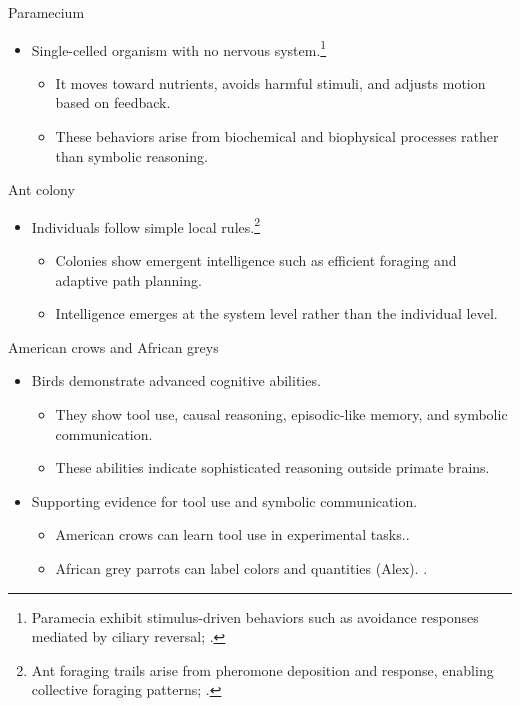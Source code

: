 \documentclass[12pt]{beamer}
\begin{document}
\begin{frame}{Paramecium}
  \begin{itemize}
    \item Single-celled organism with no nervous system.\footnote{Paramecia exhibit stimulus-driven behaviors such as avoidance responses mediated by ciliary reversal; .}
      \begin{itemize}
        \item It moves toward nutrients, avoids harmful stimuli, and adjusts motion based on feedback.
        \item These behaviors arise from biochemical and biophysical processes rather than symbolic reasoning.
      \end{itemize}
  \end{itemize}
\end{frame}

\begin{frame}{Ant colony}
  \begin{itemize}
    \item Individuals follow simple local rules.\footnote{Ant foraging trails arise from pheromone deposition and response, enabling collective foraging patterns; .}
      \begin{itemize}
        \item Colonies show emergent intelligence such as efficient foraging and adaptive path planning.
        \item Intelligence emerges at the system level rather than the individual level.
      \end{itemize}
  \end{itemize}
\end{frame}

\begin{frame}{American crows and African greys}
  \begin{itemize}
    \item Birds demonstrate advanced cognitive abilities.
      \begin{itemize}
        \item They show tool use, causal reasoning, episodic-like memory, and symbolic communication.
        \item These abilities indicate sophisticated reasoning outside primate brains.
      \end{itemize}
    \item Supporting evidence for tool use and symbolic communication.
      \begin{itemize}
        \item American crows can learn tool use in experimental tasks..
        \item African grey parrots can label colors and quantities (Alex). .
      \end{itemize}
  \end{itemize}
\end{frame}
\end{document}
